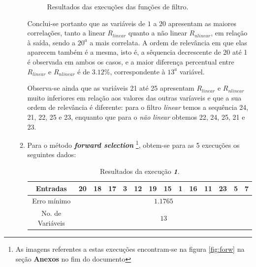 \begin{enumerate}
\begin{enumerate}
\begin{figure}[h!]
				\caption{Resultados das execuções das funções de filtro.}
				\end{figure}
				
				
			\FloatBarrier
				
			Conclui-se portanto que as variáveis de \(1\) a \(20\) apresentam as maiores
			correlações, tanto a linear \(R_{linear}\) quanto a não linear \(R_{nlinear}\),
			em relação à saída, sendo a \(20^a\) a mais correlata. A ordem de relevância em
			que elas aparecem também é a mesma, isto é, a sêquencia decrescente de 20 até 1
			é observada em ambos os casos, e a maior diferença percentual entre
			\(R_{linear}\) e \(R_{nlinear}\) é de \(3.12\%\), correspondente à \(13^a\)
			variável.
				
				\vspace{12pt}
				
			Observa-se ainda que as variáveis 21 até 25 apresentam \(R_{linear}\) e
			\(R_{nlinear}\) muito inferiores em relação aos valores das outras varíaveis
			e que a sua ordem de relevância é diferente: para o filtro \textit{linear} temos
			a sequência 24, 21, 22, 25 e 23, enquanto que para o \textit{não linear} obtemos
			22, 24, 25, 21 e 23.
			
			
			\item 
			\label{item:forwsunspot}
			Para o método \textbf{\textit{forward selection}} \footnote{As
			imagens referentes a estas execuções encontram-se na figura \ref{fig:forw}
			na seção \textbf{Anexos} no fim do documento}, obtem-se para as 5 execuções os seguintes dados:
			
			\begin{table}[H]
				    \centering
				    \footnotesize
					\caption{\label{tab:forward1_sunspot} Resultados da execução
					\textit{\textbf{1}}.}
				    \vspace{-6pt}
					\begin{tabular}{|c | c | c | c | c | c | c | c | c | c | c | c | c | c|}
					\hline
					Entradas & 20 & 18 & 17 & 3 & 12 & 19 & 15 & 1 & 16 & 11 & 23 & 5 & 7 \\
					\hline
					Erro mínimo & \multicolumn{13}{c|}{\(1.1765\)}  \\ \hline
					No. de Variáveis & \multicolumn{13}{c|}{\(13\)}  \\
					\hline
					
					\end{tabular}	    
			    \end{table}    

		\vspace{-12pt}


\end{enumerate}
\end{enumerate}
